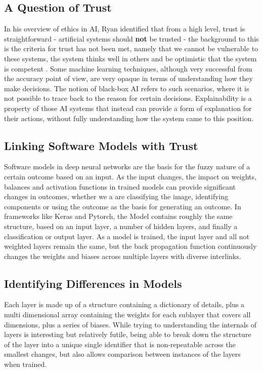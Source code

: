\subsection{A Question of Trust}

In his overview of ethics in AI, Ryan \cite{ryanAIWeTrust2020} identified that from a high level, trust is straightforward - artificial systems should \textbf{not} be trusted - the background to this is the criteria for trust has not been met, namely that we cannot be vulnerable to these systems, the system thinks well in others and be optimistic that the system is competent 
\cite{mcleodTrust2020}. Some machine learning techniques, although very successful from the accuracy point of view, are very opaque in terms of understanding how they make decisions. The notion of black-box AI refers to such scenarios, where it is not possible to trace back to the reason for certain decisions. Explainability is a property of those AI systems that instead can provide a form of explanation for their actions, without fully understanding how the system came to this position.

\subsection{Linking Software Models with Trust}
Software models in deep neural networks are the basis for the fuzzy nature of a certain outcome based on an input. As the input changes, the impact on weights, balances and activation functions in trained models can provide significant changes in outcomes, whether we a are classifying the image, identifying components or using the outcome as the basis for generating an outcome\cite{miikkulainenChapter15Evolving2019}. In frameworks like Keras and Pytorch, the Model contains roughly the same structure, based on an input layer, a number of hidden layers, and finally a classification or output layer. As a model is trained, the input layer and all not weighted layers remain the same, but the back propagation function continuously changes the weights and biases across multiple layers with diverse interlinks\cite{hecht-nielsenIIITheoryBackpropagation1992}.

\subsection{Identifying Differences in Models}
Each layer is made up of a structure containing a dictionary of details, plus a multi dimensional array containing the weights for each sublayer that covers all  dimensions, plus a series of biases. While trying to understanding the internals of layers is interesting but relatively futile, being able to break down the structure of the layer into a unique single identifier that is non-repeatable across the smallest changes, but also allows comparison between instances of the layers when trained.

